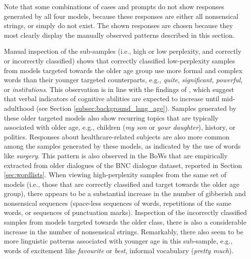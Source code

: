 \begin{table}[H]
{%
Note that some combinations of cases and prompts do not show responses generated by all four models, because these responses are either all nonsensical strings, or simply do not exist.
The shown responses are chosen because they most clearly display the manually observed patterns described in this section.}\label{tab:ctg_case_examples}
\end{table}

Manual inspection of the sub-samples (i.e., high or low perplexity, and correctly or incorrectly classified) shows that correctly classified low-perplexity samples from models targeted towards the older age group use more formal and complex words than their younger targeted counterparts, e.g., \textit{quite}, \textit{significant}, \textit{powerful}, or \textit{institutions}. 
This observation is in line with the findings of \cite{pennebaker2003words}, which suggest that verbal indicators of cognitive abilities are expected to increase until mid-adulthood (see Section \ref{subsec:background_lang_age}).
Samples generated by these older targeted models also show recurring topics that are typically associated with older age, e.g., children (\textit{my son} or \textit{your daughter}), history, or politics. 
Responses about healthcare-related subjects are also more common among the samples generated by these models, as indicated by the use of words like \textit{surgery}. This pattern is also observed in the BoWs that are empirically extracted from older dialogues of the BNC dialogue dataset, reported in Section \ref{sec:wordlists}. When viewing high-perplexity samples from the same set of models (i.e., those that are correctly classified and target towards the older age group), there appears to be a substantial increase in the number of gibberish and nonsensical sequences (space-less sequences of words, repetitions of the same words, or sequences of punctuation marks). Inspection of the incorrectly classified samples from models targeted towards the older class, there is also a considerable increase in the number of nonsensical strings. Remarkably, there also seem to be more linguistic patterns associated with younger age in this sub-sample, e.g., words of excitement like \textit{favourite} or \textit{best}, informal vocabulary (\textit{pretty much}).

